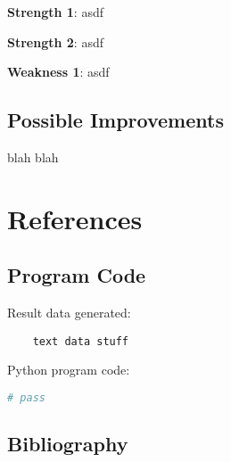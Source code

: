 \documentclass{mcmthesis}
\begin{document}
    \noindent\textbf{Strength 1}: asdf

    \noindent\textbf{Strength 2}: asdf

    \noindent\textbf{Weakness 1}: asdf

    \subsection{Possible Improvements}
    blah blah


    \newpage


    \section{References}

    \subsection{Program Code}
    \noindent Result data generated:
    \begin{verbatim}
    text data stuff

    \end{verbatim}

    \noindent Python program code:
    \begin{lstlisting}[language=Python]
        # pass

    \end{lstlisting}

    \subsection{Bibliography}
\end{document}
